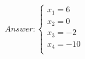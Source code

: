 \documentclass[a4paper,12pt]{article} %
\begin{document}
\begin{enumerate}
\begin{equation*}
    Answer:
    \begin{cases}
    x_1 = 6\\
    x_2 = 0\\
    x_3 = -2\\
    x_4 = -10\\
    \end{cases}
\end{equation*}

\end{enumerate}
\end{document}
